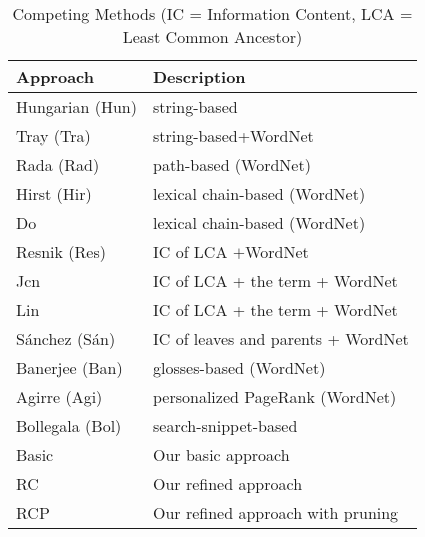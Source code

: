 \begin{table}[th]
\centering
\caption{Competing Methods (IC = Information Content, LCA = Least Common Ancestor)}
\label{tab:allmethods}
\small
\begin{tabular}{|l|l|}\hline
{\bf Approach} & {\bf Description} \\\hline\hline
Hungarian (Hun) \cite{hungarian:string}     &string-based\\\hline
Tray (Tra)\cite{tray:2005} &string-based+WordNet \\ \hline
Rada (Rad) \cite{Rada:1989} &path-based (WordNet) \\\hline
Hirst (Hir) \cite{Hirst:1998}   &lexical chain-based (WordNet) \\\hline
Do \cite{Do:DRSTV09}    &lexical chain-based (WordNet) \\\hline
Resnik (Res)\cite{Resnik:1995}  & IC of LCA $+$WordNet \\\hline
Jcn \cite{Jiang:1997}   & IC of LCA + the term + WordNet \\\hline
Lin \cite{Lin:1998} & IC of LCA + the term + WordNet\\\hline
S\'{a}nchez (S\'{a}n)\cite{Snchez:2011} & IC of leaves and parents + WordNet \\\hline
Banerjee (Ban)\cite{Banerjee:2002}  & glosses-based (WordNet) \\\hline
Agirre (Agi)\cite{Agirre:2010}  & personalized PageRank (WordNet)\\\hline
Bollegala (Bol)\cite{Bollegala:2011} &search-snippet-based  \\\hline
Basic & Our basic approach\\\hline
RC & Our refined approach \\\hline
RCP & Our refined approach with pruning \\\hline
\end{tabular}
\end{table}

